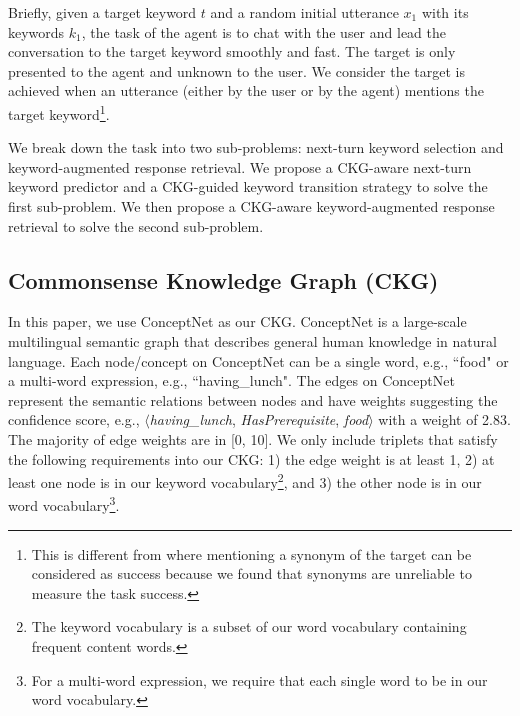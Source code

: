 \documentclass[letterpaper]{article} %
\begin{document}
Briefly, given a target keyword $t$ and a random initial utterance $x_1$ with its keywords $k_1$, the task of the agent is to chat with the user and lead the conversation to the target keyword smoothly and fast. The target is only presented to the agent and unknown to the user. We consider the target is achieved when an utterance (either by the user or by the agent) mentions the target keyword\footnote{This is different from \cite{tang2019target} where mentioning a synonym of the target can be considered as success because we found that synonyms are unreliable to measure the task success.}.

We break down the task into two sub-problems: next-turn keyword selection and keyword-augmented response retrieval. We propose a CKG-aware next-turn keyword predictor and a CKG-guided keyword transition strategy to solve the first sub-problem. We then propose a CKG-aware keyword-augmented response retrieval to solve the second sub-problem.

\subsection{Commonsense Knowledge Graph (CKG)}
\label{sec: ckg}
In this paper, we use ConceptNet \cite{speer2017conceptnet} as our CKG. ConceptNet is a large-scale multilingual semantic graph that describes general human knowledge in natural language. Each node/concept on ConceptNet can be a single word, e.g., ``food" or a multi-word expression, e.g., ``having\_lunch". The edges on ConceptNet represent the semantic relations between nodes and have weights suggesting the confidence score, e.g., $\langle$\textit{having\_lunch}, \textit{HasPrerequisite}, \textit{food}$\rangle$ with a weight of 2.83. The majority of edge weights are in [0, 10]. We only include triplets that satisfy the following requirements into our CKG: 1) the edge weight is at least 1, 2) at least one node is in our keyword vocabulary\footnote{The keyword vocabulary is a subset of our word vocabulary containing frequent content words.}, and 3) the other node is in our word vocabulary\footnote{For a multi-word expression, we require that each single word to be in our word vocabulary.}.
\end{document}

